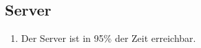 \subsection{Server}

\begin{enumerate}
    \item Der Server ist in 95\% der Zeit erreichbar. 
\end{enumerate}
